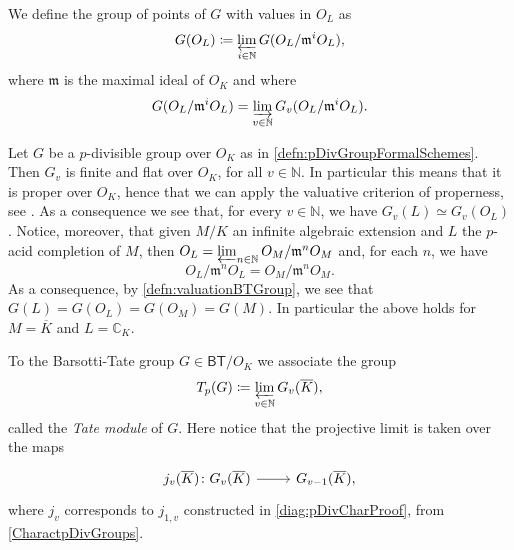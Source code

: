 \begin{defn}[]\label{defn:valuationBTGroup}
	We define the group of points of $G$ with values in $O_L$ as
	\begin{equation*}
		G(O_L) \coloneqq \varprojlim_{i \in \mathbb{N}} G(O_L/\mathfrak{m}^iO_L)
	,\end{equation*}
	where $\mathfrak{m}$ is the maximal ideal of $O_K$ and where
	\begin{equation*}
		G(O_L/\mathfrak{m}^iO_L) = \varinjlim_{v \in \mathbb{N}} G_v(O_L/\mathfrak{m}^iO_L)
	.\end{equation*}
\end{defn}


\begin{rem}[]\label{VCPBTGroups}
	Let $G$ be a $p$-divisible group over $O_K$ as in \cref{defn:pDivGroupFormalSchemes}.
	Then $G_v$ is finite and flat over $O_K$, for all $v \in \mathbb{N}$. 
	In particular this means that it is proper over $O_K$, hence
	that we can apply the valuative criterion of properness,
	see \cite[Chapter II, theorem 4.7]{Hartshorne}.
	As a consequence we see that, for every $v \in \mathbb{N}$, we have
	$G_v(L) \simeq G_v(O_L)$.
	Notice, moreover, that given $M/K$ an infinite algebraic extension
	and $L$ the $p$-acid completion of $M$, then
	$O_L = \varprojlim_{n \in \mathbb{N}}O_M/\mathfrak{m}^nO_M$
	and, for each $n$, we have
	\begin{equation*}
	O_L/\mathfrak{m}^nO_L = O_M/\mathfrak{m}^nO_M
	.\end{equation*}
	As a consequence, by \cref{defn:valuationBTGroup}, we see that
	$G(L) = G(O_L) = G(O_M) = G(M)$.
	In particular the above holds for $M = \overline{K}$ and $L = \mathbb{C}_K$.
\end{rem}


\begin{defn}
	To the Barsotti-Tate group $G \in \mathsf{BT}/O_K$ we associate the group
	\begin{equation*}
		T_p(G) \coloneqq \varprojlim_{v \in \mathbb{N}} G_v(\overline{K})
	,\end{equation*}
	called the \emph{Tate module} of $G$.
	Here notice that the projective limit is taken over the maps
	\begin{equation*}
	\begin{tikzcd}[row sep = 0ex
		,/tikz/column 1/.append style={anchor=base east}
		,/tikz/column 2/.append style={anchor=base west}]
		j_v(\overline{K})\colon 
		G_v(\overline{K})\arrow[r, "", rightarrow] &
		G_{v-1}(\overline{K})
	,\end{tikzcd}
	\end{equation*} 
	where $j_v$ corresponds to $j_{1,v}$ constructed in
	\cref{diag:pDivCharProof}, from \cref{CharactpDivGroups}.
\end{defn}


